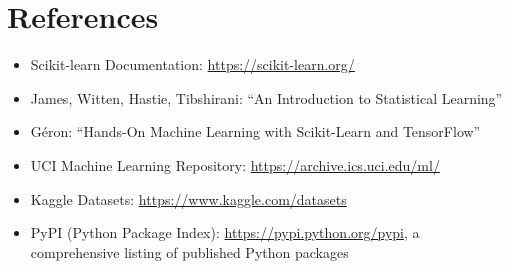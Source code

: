 






















\appendix

\section{References}
\label{sec:references}

\begin{itemize}
\item Scikit-learn Documentation: \url{https://scikit-learn.org/}
\item James, Witten, Hastie, Tibshirani: ``An Introduction to Statistical Learning''
\item Géron: ``Hands-On Machine Learning with Scikit-Learn and TensorFlow''
\item UCI Machine Learning Repository: \url{https://archive.ics.uci.edu/ml/}
\item Kaggle Datasets: \url{https://www.kaggle.com/datasets}
\item PyPI (Python Package Index): \url{https://pypi.python.org/pypi}, a comprehensive listing of published Python packages
\end{itemize}

